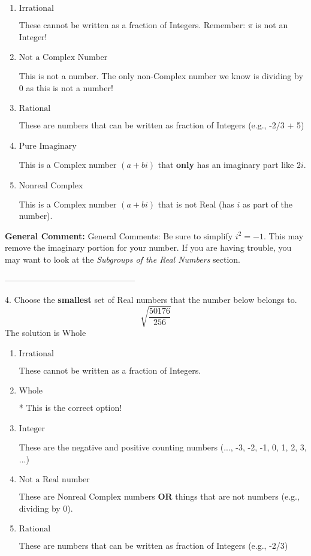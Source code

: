 \documentclass{extbook}[14pt]
\begin{document}
\begin{enumerate}[label=\Alph*.] 
\item $ \text{Irrational} $ 

 These cannot be written as a fraction of Integers. Remember: $\pi$ is not an Integer! 
\item $ \text{Not a Complex Number} $ 

 This is not a number. The only non-Complex number we know is dividing by 0 as this is not a number! 
\item $ \text{Rational} $ 

 These are numbers that can be written as fraction of Integers (e.g., -2/3 + 5) 
\item $ \text{Pure Imaginary} $ 

 This is a Complex number $(a+bi)$ that \textbf{only} has an imaginary part like $2i$. 
\item $ \text{Nonreal Complex} $ 

 This is a Complex number $(a+bi)$ that is not Real (has $i$ as part of the number). 
\end{enumerate} 
 
\textbf{General Comment:} General Comments: Be sure to simplify $i^2 = -1$. This may remove the imaginary portion for your number. If you are having trouble, you may want to look at the \textit{Subgroups of the Real Numbers} section. 

-----------------------------------------------

4. Choose the \textbf{smallest} set of Real numbers that the number below belongs to.
\[ \sqrt{\frac{50176}{256}} \] 
The solution is $ \text{Whole} $ 

\begin{enumerate}[label=\Alph*.] 
\item $ \text{Irrational} $ 

 These cannot be written as a fraction of Integers. 
\item $ \text{Whole} $ 

 * This is the correct option! 
\item $ \text{Integer} $ 

 These are the negative and positive counting numbers (..., -3, -2, -1, 0, 1, 2, 3, ...) 
\item $ \text{Not a Real number} $ 

 These are Nonreal Complex numbers \textbf{OR} things that are not numbers (e.g., dividing by 0). 
\item $ \text{Rational} $ 

 These are numbers that can be written as fraction of Integers (e.g., -2/3) 
\end{enumerate} 
 
\end{document}

